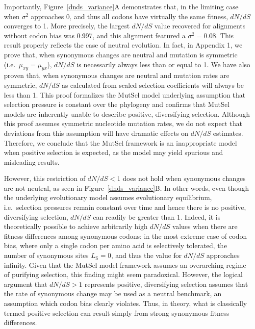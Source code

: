\documentclass{pnastwo}
\begin{document}
\begin{article}
Importantly, Figure~\ref{dnds_variance}A demonstrates that, in the limiting case when $\sigma^2$ approaches 0, and thus all codons have virtually the same fitness, $dN/dS$ converges to 1. More precisely, the largest $dN/dS$ value recovered for alignments without codon bias was 0.997, and this alignment featured a $\sigma^2 = 0.08$. This result properly reflects the case of neutral evolution. In fact, in Appendix 1, we prove that, when synonymous changes are neutral and mutation is symmetric (i.e.\ $\mu_{xy} = \mu_{yx}$), $dN/dS$ is necessarily always less than or equal to 1. We have also proven that, when synonymous changes are neutral and mutation rates are symmetric, $dN/dS$ as calculated from scaled selection coefficients will always be less than 1. This proof formalizes the MutSel model underlying assumption that selection pressure is constant over the phylogeny and confirms that MutSel models are inherently unable to describe positive, diversifying selection. Although this proof assumes symmetric nucleotide mutation rates, we do not expect that deviations from this assumption will have dramatic effects on $dN/dS$ estimates. Therefore, we conclude that the MutSel framework is an inappropriate model when positive selection is expected, as the model may yield spurious and misleading results. 

However, this restriction of $dN/dS < 1$ does not hold when synonymous changes are not neutral, as seen in Figure~\ref{dnds_variance}B. In other words, even though the underlying evolutionary model assumes evolutionary equilibrium, i.e.\ selection pressures remain constant over time and hence there is no positive, diversifying selection, $dN/dS$ can readily be greater than 1. Indeed, it is theoretically possible to achieve arbitrarily high $dN/dS$ values when there are fitness differences among synonymous codons; in the most extreme case of codon bias, where only a single codon per amino acid is selectively tolerated, the number of synonymous sites $L_\text{S} = 0$, and thus the value for $dN/dS$ approaches infinity. Given that the MutSel model framework assumes an overarching regime of purifying selection, this finding might seem paradoxical. However, the logical argument that $dN/dS > 1$ represents positive, diversifying selection assumes that the rate of synonymous change may be used as a neutral benchmark, an assumption which codon bias clearly violates. Thus, in theory, what is classically termed positive selection can result simply from strong synonymous fitness differences. 	
		

\end{article}
\end{document}
